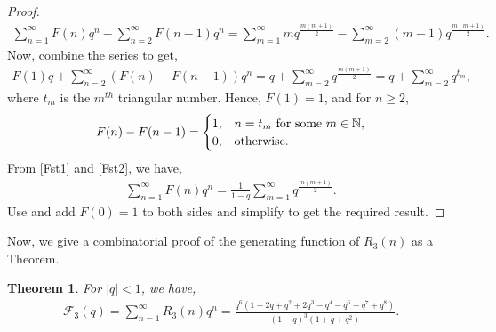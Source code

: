 \documentclass[12pt,reqno]{amsart}
\numberwithin{equation}{section}
\theoremstyle{plain}
\newtheorem{theorem}{Theorem}[section]
\begin{document}
\begin{proof}
	\begin{align*}
	 	\sum_{n=1}^{\infty} F(n) q^n - \sum_{n=2}^{\infty} F(n-1) q^{n} = \sum_{m=1}^{\infty} m q^{\frac{m(m+1)}{2}} - \sum_{m=2}^{\infty} (m-1) q^{\frac{m(m+1)}{2}}.
	\end{align*}
	Now, combine the series to get,
	\begin{align}
		F(1)q + \sum_{n=2}^{\infty} (F(n)-F(n-1)) q^n = q + \sum_{m=2}^{\infty} q^{\frac{m(m+1)}{2}} = q + \sum_{m=2}^{\infty} q^{t_m}, \label{Fst2}
	\end{align}
	where $t_m$ is the $m^{th}$ triangular number. Hence, $F(1)=1$, and for $n\geq2$,
	\begin{align}\label{FExp}
		F(n)-F(n-1)= 
		\begin{cases}
			1,& n=t_m \textup{ for some $m \in \mathbb{N}$},\\
			0,& \textup{otherwise.} 
		\end{cases}
	\end{align}
	From \eqref{Fst1} and \eqref{Fst2}, we have,
	\begin{align}
		\sum_{n=1}^{\infty} F(n) q^n = \frac{1}{1-q} \sum_{m=1}^{\infty} q^{\frac{m(m+1)}{2}}. \label{Fst3}
	\end{align}
	Use \cite[Corollary 2.10]{AndrewsBook} and add $F(0)=1$ to both sides and simplify to get the required result.
	\end{proof}
	Now, we give a combinatorial proof of the generating function of $R_3(n)$ as a Theorem.
	\begin{theorem}\label{F3T}
		For $|q|<1$, we have,
		\begin{align}
			\mathscr{F}_3(q)= \sum_{n=1}^{\infty} R_3(n) q^n = \frac{q^6(1+2q+q^2+2q^3-q^4-q^6-q^7+q^8)}{(1-q)^3(1+q+q^2)}. \label{ScrF3GF}
 		\end{align}
	\end{theorem}
\end{document}
